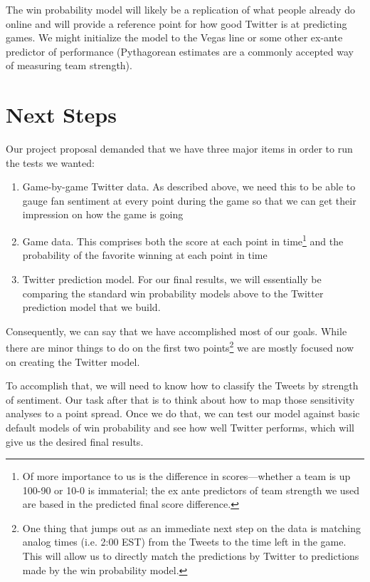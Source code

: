 \documentclass[12pt]{article}
\begin{document}
\noindent
The win probability model will likely be a replication of what people already do online and will provide a reference point for how good Twitter is at predicting games. We might initialize the model to the Vegas line or some other ex-ante predictor of performance (Pythagorean estimates are a commonly accepted way of measuring team strength). 

\section*{Next Steps}

Our project proposal demanded that we have three major items in order to run the tests we wanted:
\begin{enumerate}
	\item Game-by-game Twitter data. As described above, we need this to be able to gauge fan sentiment at every point during the game so that we can get their impression on how the game is going
	\item Game data. This comprises both the score at each point in time\footnote{Of more importance to us is the difference in scores---whether a team is up 100-90 or 10-0 is immaterial; the ex ante predictors of team strength we used are based in the predicted final score difference.} and the probability of the favorite winning at each point in time
	\item Twitter prediction model. For our final results, we will essentially be comparing the standard win probability models above to the Twitter prediction model that we build. 
\end{enumerate}

Consequently, we can say that we have accomplished most of our goals. While there are minor things to do on the first two points\footnote{One thing that jumps out as an immediate next step on the data is matching analog times (i.e. 2:00 EST) from the Tweets to the time left in the game. This will allow us to directly match the predictions by Twitter to predictions made by the win probability model.} we are mostly focused now on creating the Twitter model. 

To accomplish that, we will need to know how to classify the Tweets by strength of sentiment. Our task after that is to think about how to map those sensitivity analyses to a point spread. Once we do that, we can test our model against basic default models of win probability and see how well Twitter performs, which will give us the desired final results.  
\end{document}
